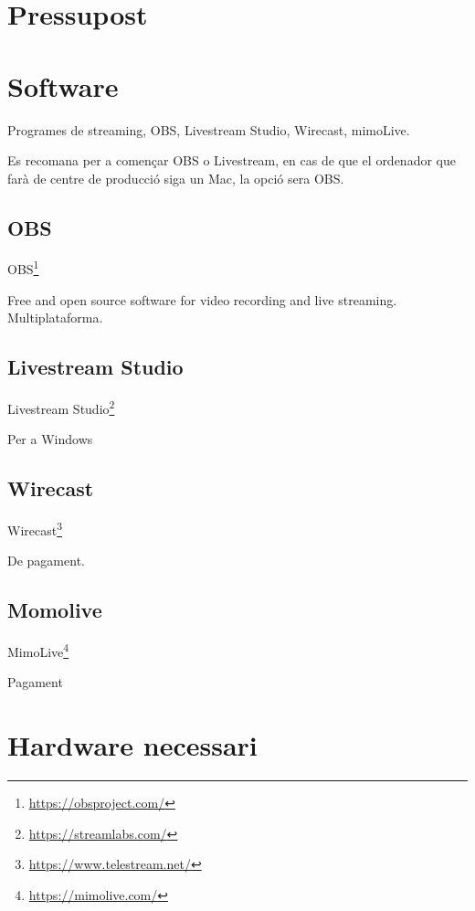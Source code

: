 \documentclass[
  10pt, krantz2,
]{krantz}
\DeclareRobustCommand{\href}[2]{#2\footnote{\url{#1}}}
\renewcommand{\href}[2]{#2\footnote{\url{#1}}}
\begin{document}
\hypertarget{pressupost}{%
\section{Pressupost}\label{pressupost}}

\hypertarget{software}{%
\section{Software}\label{software}}

Programes de streaming, OBS, Livestream Studio, Wirecast, mimoLive.

Es recomana per a començar OBS o Livestream, en cas de que el ordenador que farà de centre de producció siga un Mac, la opció sera OBS.

\hypertarget{obs}{%
\subsection{OBS}\label{obs}}

\href{https://obsproject.com/}{OBS}

Free and open source software for video recording and live streaming. Multiplataforma.

\hypertarget{livestream-studio}{%
\subsection{Livestream Studio}\label{livestream-studio}}

\href{https://streamlabs.com/}{Livestream Studio}

Per a Windows

\hypertarget{wirecast}{%
\subsection{Wirecast}\label{wirecast}}

\href{https://www.telestream.net/}{Wirecast}

De pagament.

\hypertarget{momolive}{%
\subsection{Momolive}\label{momolive}}

\href{https://mimolive.com/}{MimoLive}

Pagament

\hypertarget{hardware-necessari}{%
\section{Hardware necessari}\label{hardware-necessari}}
\end{document}
